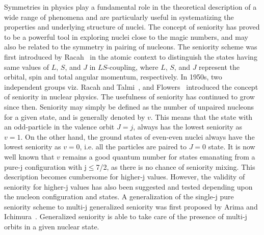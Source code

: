 \documentclass[twocolumn,showpacs,showkeys,preprintnumbers,amsmath,amssymb]{revtex4}
\begin{document}
Symmetries in physics play a fundamental role in the theoretical description of a wide range of phenomena and are particularly useful in systematizing the properties and underlying structure of nuclei. The concept of seniority has proved to be a powerful tool in exploring nuclei close to the magic numbers, and may also be related to the symmetry in pairing of nucleons. The seniority scheme was first introduced by Racah~\cite{racah} in the atomic context to distinguish the states having same values of $L$, $S$, and $J$ in $LS$-coupling, where $L$, $S$, and $J$ represent the orbital, spin and total angular momentum, respectively. In 1950s, two independent groups viz. Racah and Talmi~\cite{Racah1952}, and Flowers~\cite{Flowers1952} introduced the concept of seniority in nuclear physics. The usefulness of seniority has continued to grow since then. Seniority may simply be defined as the number of unpaired nucleons for a given state, and is generally denoted by $v$. This means that the state with an odd-particle in the valence orbit $J=j$, always has the lowest seniority as $v=1$. On the other hand, the ground states of even-even nuclei always have the lowest seniority as $v=0$, i.e. all the particles are paired to $J=0$ state. It is now well known that $v$ remains a good quantum number for states emanating from a pure-j configuration with j$\le$7/2, as there is no chance of seniority mixing. This description becomes cumbersome for higher-j values. However, the validity of seniority for higher-j values has also been suggested and tested depending upon the nucleon configuration and states. A generalization of the single-j pure seniority scheme to multi-j generalized seniority was first proposed by Arima and Ichimura~\cite{arima}. Generalized seniority is able to take care of the presence of multi-j orbits in a given nuclear state. 
\end{document}
